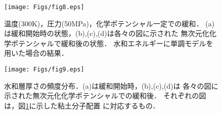 \begin{figure}[h]
	\begin{center}
	\texttt{[image: Figs/fig8.eps]} 
	\end{center}
	\caption{
		温度(300K)，圧力(50MPa)，化学ポテンシャル一定での緩和．
		(a)は緩和開始時の状態，(b),(c),(d)は各々の図に示された
		無次元化化学ポテンシャルで緩和後の状態．
		水和エネルギーに単調モデルを用いた場合の結果．
	} 
	\label{fig:fig8}
\end{figure}
\begin{figure}[h]
	\begin{center}
	\texttt{[image: Figs/fig9.eps]} 
	\end{center}
	\caption{
		水和層厚さの頻度分布．(a)は緩和開始時，(b),(c),(d)は
		各々の図に示された無次元化化学ポテンシャルでの緩和後．
		それぞれの図は，図\ref{fig:fig8}に示した粘土分子配置
		に対応するもの．
	} 
	\label{fig:fig9}
\end{figure}
